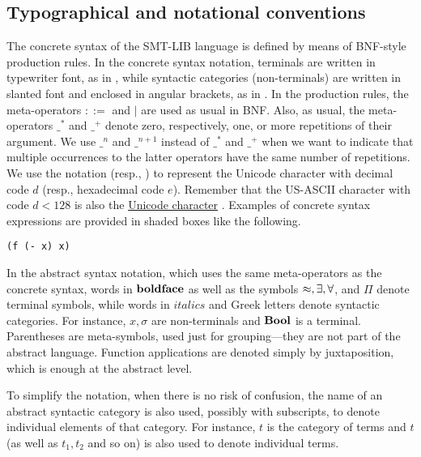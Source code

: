 \subsection{Typographical and notational conventions}

The concrete syntax of the SMT-LIB language is defined
by means of BNF-style production rules.
In the concrete syntax notation,
terminals are written in typewriter font, as in ,
while syntactic categories (non-terminals) are written 
in slanted font and enclosed in angular brackets, as in .
In the production rules, the meta-operators $::=$ and $\mid$ are used as usual 
in BNF. 
Also, as usual, the meta-operators $\_^*$ and $\_^+$ denote zero, respectively, 
one, or more repetitions of their argument.
We use $\_^n$ and $\_^{n+1}$ instead of $\_^*$ and $\_^+$ 
when we want to indicate that multiple occurrences to the latter operators 
have the same number of repetitions.
We use the notation  (resp., ) to represent 
the Unicode character with decimal code $d$ (resp., hexadecimal code $e$).  Remember that the US-ASCII character with code $d < 128$ is also 
the \href{http://www.utf8-chartable.de/unicode-utf8-table.pl?utf8=dec}{Unicode character} .
Examples of concrete syntax expressions are provided in shaded boxes like the following.
\begin{lstlisting}[linewidth=10em]
(f (- x) x) 
\end{lstlisting}
 
In the abstract syntax notation,
which uses the same meta-operators as the concrete syntax,
words in $\textbf{boldface}$ as well as the symbols $\approx, \exists, \forall$, 
and $\Pi$ denote terminal symbols,
while words in $\mathit{italics}$ and Greek letters denote 
syntactic categories.
For instance, $x, \sigma$ are non-terminals and $\textbf{Bool}$ is a terminal.
Parentheses are meta-symbols, used just for grouping---they are not part
of the abstract language.
Function applications are denoted simply by juxtaposition, 
which is enough at the abstract level.

To simplify the notation, 
when there is no risk of confusion,
the name of an abstract syntactic category is also used,
possibly with subscripts, to denote individual elements of that category.
For instance, $t$ is the category of terms
and $t$ (as well as $t_1, t_2$ and so on) is also used to denote individual terms. 

